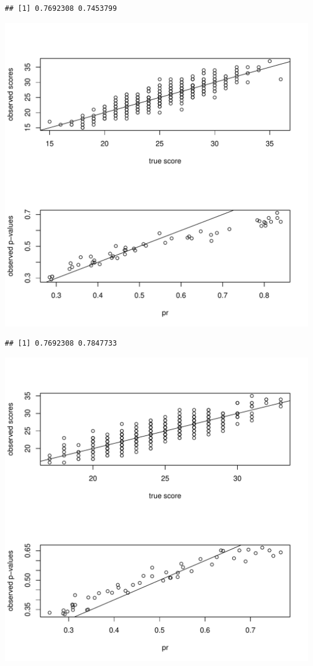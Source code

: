 \documentclass{article}\usepackage[]{graphicx}\usepackage[]{color}
\makeatletter
\def\maxwidth{ %
  \ifdim\Gin@nat@width>\linewidth
    \linewidth
  \else
    \Gin@nat@width
  \fi
}
\newenvironment{kframe}{%
 \def\at@end@of@kframe{}%
 \ifinner\ifhmode%
  \def\at@end@of@kframe{\end{minipage}}%
  \begin{minipage}{\columnwidth}%
 \fi\fi%
 \def\FrameCommand##1{\hskip\@totalleftmargin \hskip-\fboxsep
 \colorbox{shadecolor}{##1}\hskip-\fboxsep
     \hskip-\linewidth \hskip-\@totalleftmargin \hskip\columnwidth}%
 \MakeFramed {\advance\hsize-\width
   \@totalleftmargin\z@ \linewidth\hsize
   \@setminipage}}%
 {\par\unskip\endMakeFramed%
 \at@end@of@kframe}
\newenvironment{knitrout}{}{} %
\makeatother
\begin{document}
\begin{knitrout}
\begin{kframe}\begin{verbatim}
## [1] 0.7692308 0.7453799
\end{verbatim}
\end{kframe}
\includegraphics[width=\maxwidth]{figure/unnamed-chunk-2-4} 
\begin{kframe}\begin{verbatim}
## [1] 0.7692308 0.7847733
\end{verbatim}
\end{kframe}
\includegraphics[width=\maxwidth]{figure/unnamed-chunk-2-5} 

\end{knitrout}
\end{document}
